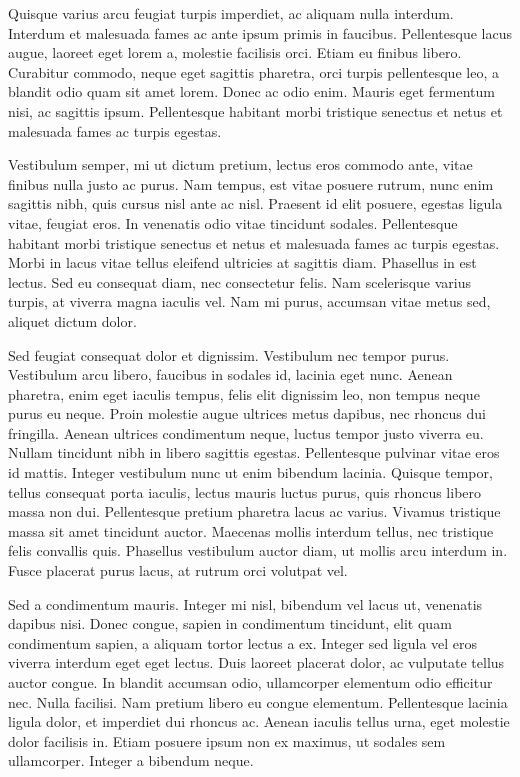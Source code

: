 \documentclass[]{article}
\begin{document}
Quisque varius arcu feugiat turpis imperdiet, ac aliquam nulla interdum.
Interdum et malesuada fames ac ante ipsum primis in faucibus.
Pellentesque lacus augue, laoreet eget lorem a, molestie facilisis orci.
Etiam eu finibus libero. Curabitur commodo, neque eget sagittis
pharetra, orci turpis pellentesque leo, a blandit odio quam sit amet
lorem. Donec ac odio enim. Mauris eget fermentum nisi, ac sagittis
ipsum. Pellentesque habitant morbi tristique senectus et netus et
malesuada fames ac turpis egestas.

Vestibulum semper, mi ut dictum pretium, lectus eros commodo ante, vitae
finibus nulla justo ac purus. Nam tempus, est vitae posuere rutrum, nunc
enim sagittis nibh, quis cursus nisl ante ac nisl. Praesent id elit
posuere, egestas ligula vitae, feugiat eros. In venenatis odio vitae
tincidunt sodales. Pellentesque habitant morbi tristique senectus et
netus et malesuada fames ac turpis egestas. Morbi in lacus vitae tellus
eleifend ultricies at sagittis diam. Phasellus in est lectus. Sed eu
consequat diam, nec consectetur felis. Nam scelerisque varius turpis, at
viverra magna iaculis vel. Nam mi purus, accumsan vitae metus sed,
aliquet dictum dolor.

Sed feugiat consequat dolor et dignissim. Vestibulum nec tempor purus.
Vestibulum arcu libero, faucibus in sodales id, lacinia eget nunc.
Aenean pharetra, enim eget iaculis tempus, felis elit dignissim leo, non
tempus neque purus eu neque. Proin molestie augue ultrices metus
dapibus, nec rhoncus dui fringilla. Aenean ultrices condimentum neque,
luctus tempor justo viverra eu. Nullam tincidunt nibh in libero sagittis
egestas. Pellentesque pulvinar vitae eros id mattis. Integer vestibulum
nunc ut enim bibendum lacinia. Quisque tempor, tellus consequat porta
iaculis, lectus mauris luctus purus, quis rhoncus libero massa non dui.
Pellentesque pretium pharetra lacus ac varius. Vivamus tristique massa
sit amet tincidunt auctor. Maecenas mollis interdum tellus, nec
tristique felis convallis quis. Phasellus vestibulum auctor diam, ut
mollis arcu interdum in. Fusce placerat purus lacus, at rutrum orci
volutpat vel.

Sed a condimentum mauris. Integer mi nisl, bibendum vel lacus ut,
venenatis dapibus nisi. Donec congue, sapien in condimentum tincidunt,
elit quam condimentum sapien, a aliquam tortor lectus a ex. Integer sed
ligula vel eros viverra interdum eget eget lectus. Duis laoreet placerat
dolor, ac vulputate tellus auctor congue. In blandit accumsan odio,
ullamcorper elementum odio efficitur nec. Nulla facilisi. Nam pretium
libero eu congue elementum. Pellentesque lacinia ligula dolor, et
imperdiet dui rhoncus ac. Aenean iaculis tellus urna, eget molestie
dolor facilisis in. Etiam posuere ipsum non ex maximus, ut sodales sem
ullamcorper. Integer a bibendum neque.
\end{document}
